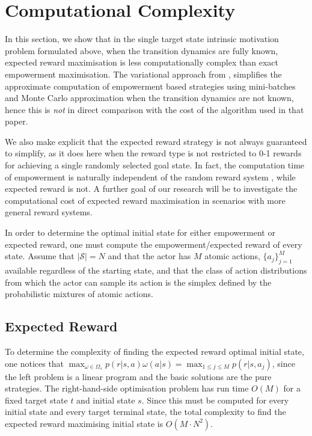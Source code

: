 \documentclass{article}
\newcommand{\Ss}{\mathcal{S}}
\begin{document}
\section{Computational Complexity}
In this section, we show that in the single target state intrinsic motivation problem formulated above, when the transition dynamics are fully known, expected reward maximisation is less computationally complex than exact empowerment maximisation. 
The variational approach from \cite{mohamed2015variational}, simplifies the approximate computation of empowerment based strategies using mini-batches and Monte Carlo approximation when the transition dynamics are not known, hence this is \textit{not} in direct comparison with the cost of the algorithm used in that paper. 

We also make explicit that the expected reward strategy is not always guaranteed to simplify, as it does here when the reward type is not restricted to 0-1 rewards for achieving a single randomly selected goal state. In fact, the computation time of empowerment is naturally independent of the random reward system%
, while expected reward is not.
A further goal of our research will be to investigate the computational cost of expected reward maximisation in scenarios with more general reward systems.
 
In order to determine the optimal initial state for either empowerment or expected reward, one must compute the empowerment/expected reward of every state.
Assume that $|\Ss|=N$ and that the actor has $M$ atomic actions, $\{a_j\}_{j=1}^M$ available regardless of the starting state, and that the class of action distributions from which the actor can sample its action is the simplex defined by the probabilistic mixtures of atomic actions. 

\subsection{Expected Reward}
To determine the complexity of finding the expected reward optimal initial state, one notices that $\max_{\omega\in\Omega_s} p(r|s,a)\omega(a|s) = \max_{1\leq j \leq M} p(r|s,a_j)$, since the left problem is a linear program and the basic solutions are the pure strategies.
The right-hand-side optimisation problem has run time $O(M)$ for a fixed target state $t$ and initial state $s$. Since this must be computed for every initial state and every target terminal state, the total complexity to find the expected reward maximising initial state is $O(M\cdot N^2)$. 
\end{document}
